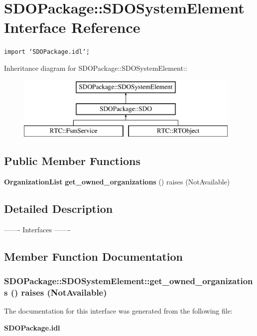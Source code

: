 \section{SDOPackage::SDOSystem\-Element Interface Reference}
\label{interfaceSDOPackage_1_1SDOSystemElement}
{\tt import \char`\"{}SDOPackage.idl\char`\"{};}

Inheritance diagram for SDOPackage::SDOSystem\-Element::\begin{figure}[H]
\begin{center}
\leavevmode
\includegraphics[height=3cm]{interfaceSDOPackage_1_1SDOSystemElement}
\end{center}
\end{figure}
\subsection*{Public Member Functions}
\begin{CompactItemize}
\item 
{\bf Organization\-List} {\bf get\_\-owned\_\-organizations} ()  raises (Not\-Available)
\end{CompactItemize}


\subsection{Detailed Description}
------- Interfaces ------- 



\subsection{Member Function Documentation}
\subsubsection{ SDOPackage::SDOSystem\-Element::get\_\-owned\_\-organizations ()  raises (Not\-Available)}\label{interfaceSDOPackage_1_1SDOSystemElement_SDOPackage_1_1SDOSystemElementa0}




The documentation for this interface was generated from the following file:\begin{CompactItemize}
\item 
{\bf SDOPackage.idl}\end{CompactItemize}
